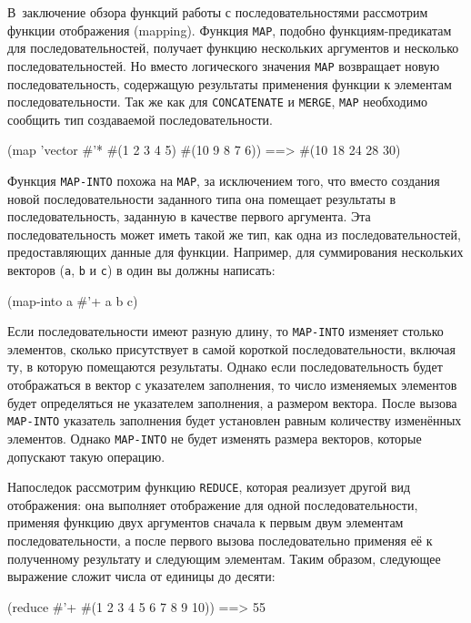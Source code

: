 В~заключение обзора функций работы с последовательностями рассмотрим
функции отображения (mapping).  Функция \lstinline{MAP}, подобно функциям-предикатам для
последовательностей, получает функцию нескольких аргументов и несколько
последовательностей.  Но вместо логического значения \lstinline{MAP} возвращает новую
последовательность, содержащую результаты применения функции к элементам
последовательности.  Так же как для \lstinline{CONCATENATE} и \lstinline{MERGE}, \lstinline{MAP}
необходимо сообщить тип создаваемой последовательности.

\begin{myverb}
(map 'vector #'* #(1 2 3 4 5) #(10 9 8 7 6)) ==> #(10 18 24 28 30)
\end{myverb}

Функция \lstinline{MAP-INTO} похожа на \lstinline{MAP}, за исключением того, что вместо создания
новой последовательности заданного типа она помещает результаты в последовательность,
заданную в качестве первого аргумента.  Эта последовательность может иметь такой же тип,
как одна из последовательностей, предоставляющих данные для функции.  Например, для
суммирования нескольких векторов (\lstinline{a}, \lstinline{b} и \lstinline{c}) в один вы должны
написать:

\begin{myverb}
(map-into a #'+ a b c)
\end{myverb}

Если последовательности имеют разную длину, то \lstinline{MAP-INTO} изменяет столько элементов,
сколько присутствует в самой короткой последовательности, включая ту, в которую помещаются
результаты.  Однако если последовательность будет отображаться в вектор с указателем
заполнения, то число изменяемых элементов будет определяться не указателем заполнения, а
размером вектора.  После вызова \lstinline{MAP-INTO} указатель заполнения будет установлен
равным количеству изменённых элементов. Однако \lstinline{MAP-INTO} не будет изменять размера
векторов, которые допускают такую операцию.

Напоследок рассмотрим функцию \lstinline{REDUCE},
которая реализует другой вид отображения: она выполняет отображение для
одной последовательности, применяя функцию двух аргументов сначала к первым двум элементам
последовательности, а после первого вызова последовательно применяя её к полученному
результату и следующим элементам.  Таким образом, следующее выражение сложит числа от
единицы до десяти:

\begin{myverb}
(reduce #'+ #(1 2 3 4 5 6 7 8 9 10)) ==> 55
\end{myverb}

